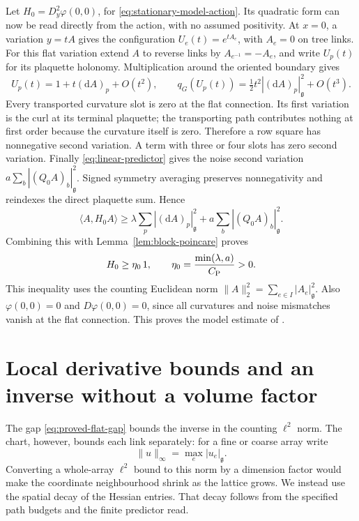 \documentclass[11pt,reqno]{amsart}
\numberwithin{equation}{section}
\theoremstyle{definition}
\theoremstyle{remark}
\newcommand{\dd}{\mathrm d}
\newcommand{\g}{\mathfrak g}
\begin{document}
Let \(H_0=D_y^2\varphi(0,0)\), for
\eqref{eq:stationary-model-action}. Its quadratic form can now
be read directly from the action, with no assumed positivity.
At \(x=0\), a variation \(y=tA\) gives the configuration
\(U_e(t)=e^{tA_e}\), with \(A_e=0\) on tree links.
For this flat variation extend \(A\) to reverse links by
\(A_{e^{-1}}=-A_e\), and write \(U_p(t)\) for its plaquette holonomy.
Multiplication around the oriented boundary gives
\[
       U_p(t)=1+t(\dd A)_p+O(t^2),\qquad
       q_G(U_p(t))=\tfrac12t^2|(\dd A)_p|_{\g}^2+O(t^3).
\]
Every transported curvature slot is zero at the flat connection.
Its first variation is the curl at its terminal plaquette;
the transporting path contributes nothing at first order because
the curvature itself is zero. Therefore a row square has
nonnegative second variation. A term with three or four slots
has zero second variation. Finally \eqref{eq:linear-predictor}
gives the noise second variation
\(a\sum_b|(Q_0A)_b|_{\g}^2\). Signed symmetry averaging preserves
nonnegativity and reindexes the direct plaquette sum. Hence
\begin{equation}
       \langle A,H_0A\rangle
          \ge\lambda\sum_p|(\dd A)_p|_{\g}^2
                         +a\sum_b|(Q_0A)_b|_{\g}^2.
 \label{eq:actual-flat-quadratic}
\end{equation}
Combining this with Lemma~\ref{lem:block-poincare} proves
\begin{equation}
                  H_0\ge\eta_0\,1,\qquad
                  \eta_0=\frac{\min(\lambda,a)}{C_{\rm P}}>0.
 \label{eq:proved-flat-gap}
\end{equation}
This inequality uses the counting Euclidean norm
\(\|A\|_2^2=\sum_{e\in I}|A_e|_{\g}^2\).
Also \(\varphi(0,0)=0\) and \(D\varphi(0,0)=0\), since all
curvatures and noise mismatches vanish at the flat connection.
This proves the model estimate of
\cite[Proposition~14.12 and (14.24), p.~66]{Main}.

\section{Local derivative bounds and an inverse without a volume factor}
\label{sec:stationary-local-bounds}

The gap \eqref{eq:proved-flat-gap} bounds the inverse in the
counting \(\ell^2\) norm. The chart, however, bounds each link
separately: for a fine or coarse array write
\[
                   \|u\|_\infty=\max_e|u_e|_{\g}.
\]
Converting a whole-array \(\ell^2\) bound to this norm by a
dimension factor would make the coordinate neighbourhood shrink
as the lattice grows. We instead use the spatial decay of the
Hessian entries. That decay follows from the specified path
budgets and the finite predictor read.
\end{document}
